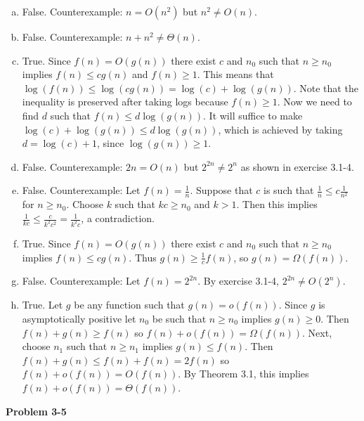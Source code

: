 \documentclass{article}
\begin{document}
\begin{enumerate}[a.]
\item False.  Counterexample: $n = O(n^2)$ but $n^2 \neq O(n)$. \\

\item False.  Counterexample: $n + n^2 \neq \Theta(n)$. \\

\item True.  Since $f(n) = O(g(n))$ there exist $c$ and $n_0$ such that $n \geq n_0$ implies $f(n) \leq cg(n)$ and $f(n) \geq 1$.  This means that $\log(f(n)) \leq \log(cg(n)) = \log(c) + \log(g(n))$.  Note that the inequality is preserved after taking logs because $f(n) \geq 1$.  Now we need to find $d$ such that $f(n) \leq d\log(g(n))$.  It will suffice to make $\log(c) + \log(g(n)) \leq d\log(g(n))$, which is achieved by taking $d = \log(c) + 1$, since $\log(g(n)) \geq 1$.\\

\item False.  Counterexample: $2n = O(n)$ but $2^{2n} \neq 2^{n}$ as shown in exercise 3.1-4. \\

\item False.  Counterexample: Let $f(n) = \frac{1}{n}$. Suppose that $c$ is such that $\frac{1}{n} \leq c \frac{1}{n^2}$ for $n \geq n_0$.  Choose $k$ such that $kc \geq n_0$ and $k > 1$.  Then this implies $\frac{1}{kc} \leq \frac{c}{k^2c^2} = \frac{1}{k^2 c}$, a contradiction.  \\

\item True.  Since $f(n) = O(g(n))$ there exist $c$ and $n_0$ such that $n \geq n_0$ implies $f(n) \leq c g(n)$.  Thus $g(n) \geq \frac{1}{c} f(n)$, so $g(n) = \Omega(f(n))$. \\

\item False.  Counterexample: Let $f(n) = 2^{2n}$.  By exercise 3.1-4, $2^{2n} \neq O(2^n)$. \\

\item True.  Let $g$ be any function such that $g(n) = o(f(n))$.  Since $g$ is asymptotically positive let $n_0$ be such that $n \geq n_0$ implies $g(n) \geq 0$.  Then $f(n) + g(n) \geq f(n)$ so $f(n) + o(f(n)) = \Omega(f(n))$.  Next, choose $n_1$ such that $n \geq n_1$ implies $g(n) \leq f(n)$.  Then $f(n) + g(n) \leq f(n) + f(n) = 2f(n)$ so $f(n) + o(f(n)) = O(f(n))$.  By Theorem 3.1, this implies $f(n) + o(f(n)) = \Theta(f(n))$. 
\end{enumerate}
\noindent\textbf{Problem 3-5}\\
\end{document}
